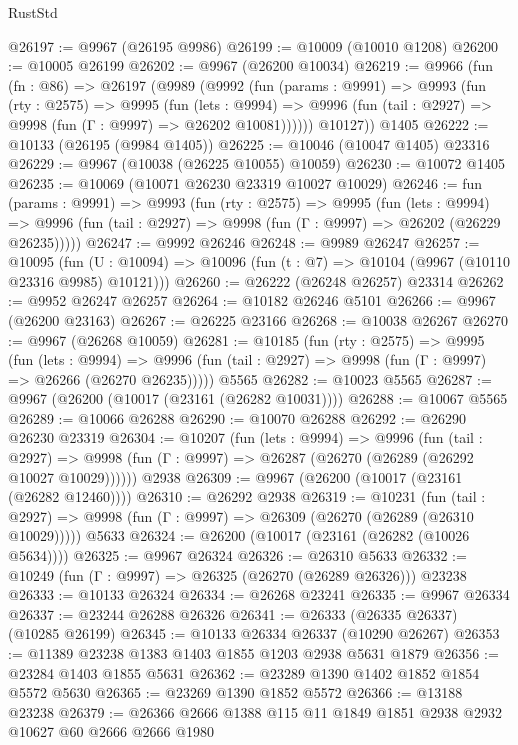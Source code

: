 \begin{lexlean}{RustStd}
\begin{coremodule}
@26197 := @9967 (@26195 @9986)
@26199 := @10009 (@10010 @1208)
@26200 := @10005 @26199
@26202 := @9967 (@26200 @10034)
@26219 := @9966
    (fun (fn : @86) =>
    @26197
      (@9989
        (@9992
          (fun (params : @9991) =>
          @9993
            (fun (rty : @2575) =>
            @9995
              (fun (lets : @9994) =>
              @9996 (fun (tail : @2927) => @9998 (fun (Γ : @9997) => @26202 @10081))))))
        @10127))
    @1405
@26222 := @10133 (@26195 (@9984 @1405))
@26225 := @10046 (@10047 @1405) @23316
@26229 := @9967 (@10038 (@26225 @10055) @10059)
@26230 := @10072 @1405
@26235 := @10069 (@10071 @26230 @23319 @10027 @10029)
@26246 := fun (params : @9991) =>
  @9993
    (fun (rty : @2575) =>
    @9995
      (fun (lets : @9994) =>
      @9996 (fun (tail : @2927) => @9998 (fun (Γ : @9997) => @26202 (@26229 @26235)))))
@26247 := @9992 @26246
@26248 := @9989 @26247
@26257 := @10095
    (fun (U : @10094) => @10096 (fun (t : @7) => @10104 (@9967 (@10110 @23316 @9985) @10121)))
@26260 := @26222 (@26248 @26257) @23314
@26262 := @9952 @26247 @26257
@26264 := @10182 @26246 @5101
@26266 := @9967 (@26200 @23163)
@26267 := @26225 @23166
@26268 := @10038 @26267
@26270 := @9967 (@26268 @10059)
@26281 := @10185
    (fun (rty : @2575) =>
    @9995
      (fun (lets : @9994) =>
      @9996 (fun (tail : @2927) => @9998 (fun (Γ : @9997) => @26266 (@26270 @26235)))))
    @5565
@26282 := @10023 @5565
@26287 := @9967 (@26200 (@10017 (@23161 (@26282 @10031))))
@26288 := @10067 @5565
@26289 := @10066 @26288
@26290 := @10070 @26288
@26292 := @26290 @26230 @23319
@26304 := @10207
    (fun (lets : @9994) =>
    @9996
      (fun (tail : @2927) =>
      @9998 (fun (Γ : @9997) => @26287 (@26270 (@26289 (@26292 @10027 @10029))))))
    @2938
@26309 := @9967 (@26200 (@10017 (@23161 (@26282 @12460))))
@26310 := @26292 @2938
@26319 := @10231
    (fun (tail : @2927) => @9998 (fun (Γ : @9997) => @26309 (@26270 (@26289 (@26310 @10029)))))
    @5633
@26324 := @26200 (@10017 (@23161 (@26282 (@10026 @5634))))
@26325 := @9967 @26324
@26326 := @26310 @5633
@26332 := @10249 (fun (Γ : @9997) => @26325 (@26270 (@26289 @26326))) @23238
@26333 := @10133 @26324
@26334 := @26268 @23241
@26335 := @9967 @26334
@26337 := @23244 @26288 @26326
@26341 := @26333 (@26335 @26337) (@10285 @26199)
@26345 := @10133 @26334 @26337 (@10290 @26267)
@26353 := @11389 @23238 @1383 @1403 @1855 @1203 @2938 @5631 @1879
@26356 := @23284 @1403 @1855 @5631
@26362 := @23289 @1390 @1402 @1852 @1854 @5572 @5630
@26365 := @23269 @1390 @1852 @5572
@26366 := @13188 @23238
@26379 := @26366 @2666 @1388 @115 @11 @1849 @1851 @2938 @2932 @10627 @60 @2666 @2666 @1980

\end{coremodule}
\end{lexlean}
